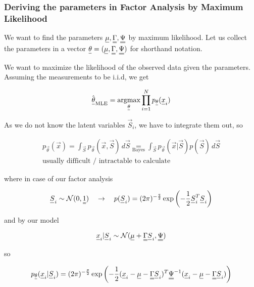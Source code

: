 \subsubsection{Deriving the parameters in Factor Analysis by Maximum Likelihood}
We want to find the parameters $\vec{\mu}, \mat{\Gamma}, \mat{\Psi}$ by maximum likelihood.
Let us collect the parameters in a vector $\vec{\theta} = (\vec{\mu}, \mat{\Gamma}, \mat{\Psi})$ for 
shorthand notation.

We want to maximize the likelihood of the observed data given the parameters. Assuming the measurements to be i.i.d, we get

\begin{equation}
    \hat{\vec{\theta}}_{\text{MLE}} = \argmax_{\vec{\theta}} \prod_{i=1}^{N} p_{\vec{\theta}}(\vec{x}_i)
\end{equation}

As we do not know the latent variables $\vec{S}_i$, we have to integrate them out, so

\begin{equation}
    \begin{gathered}
        p_\vec{\theta}(\vec{x}) = \int_\vec{S} p_\vec{\theta} (\vec{x}, \vec{S}) \, d\vec{S} \underset{\text{Bayes}}{=} \int_\vec{S} p_\vec{\theta} (\vec{x} | \vec{S}) p(\vec{S}) \, d\vec{S} \\
        \text{usually difficult / intractable to calculate}
    \end{gathered}
\end{equation}

where in case of our factor analysis

\begin{equation}
    \vec{S}_i \sim \mathcal{N}(0, \mat{1}) \quad \rightarrow \quad p(\vec{S}_i) = (2\pi)^{-\frac{q}{2}} \exp \left( -\frac{1}{2} \vec{S}_i^T \vec{S}_i \right)
\end{equation}

and by our model

\begin{equation}
    \vec{x}_i | \vec{S}_i \sim \mathcal{N}(\vec{\mu} + \mat{\Gamma} \vec{S}_i, \mat{\Psi})
\end{equation}

so

\begin{equation}
    p_\vec{\theta}(\vec{x}_i | \vec{S}_i) = (2\pi)^{-\frac{p}{2}} \exp \left( -\frac{1}{2} (\vec{x}_i - \vec{\mu} - \mat{\Gamma} \vec{S}_i)^T \mat{\Psi}^{-1} (\vec{x}_i - \vec{\mu} - \mat{\Gamma} \vec{S}_i) \right)
\end{equation}

